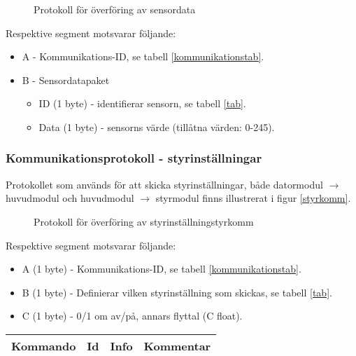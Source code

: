 \documentclass[11pt]{article}
\begin{document}
\begin{flushleft}
 \begin{figure}[H]
\centering
\noindent\resizebox{.8\linewidth}{!}{
	}
	\caption{Protokoll för överföring av sensordata\label{sensordata}}	
\end{figure} 

Respektive segment motsvarar följande: 
\begin{itemize}
	\item A - Kommunikations-ID, se tabell \ref{kommunikationstab}.
	\item B - Sensordatapaket
	\begin{itemize}
	\item ID (1 byte) - identifierar sensorn, se tabell \ref{tab}.
	\item Data (1 byte) - sensorns värde (tillåtna värden: 0-245).
	\end{itemize}
\end{itemize}

\subsubsection{Kommunikationsprotokoll - styrinställningar}
Protokollet som används för att skicka styrinställningar, både datormodul $\rightarrow$ huvudmodul och huvudmodul $\rightarrow$ styrmodul finns illustrerat i figur \ref{styrkomm}.

\begin{figure}[htbp]
\centering
\noindent\resizebox{.8\linewidth}{!}{
	}
	\caption{Protokoll för överföring av styrinställning{styrkomm}}	
\end{figure}

Respektive segment motsvarar följande: 
\begin{itemize}
	\item A (1 byte) - Kommunikations-ID, se tabell \ref{kommunikationstab}.
	\item B (1 byte) - Definierar vilken styrinställning som skickas, se tabell \ref{tab}.
	\item C (1 byte) - 0/1 om av/på, annars flyttal (C float).
\end{itemize}

\pagebreak

\begin{table}[h]
\begin{tabular}{|p{6em}|p{1em}|p{6em}|p{25em}|} \hline

\textbf{Kommando} & \textbf{Id} & \textbf{Info} & \textbf{Kommentar}\\ \hline


\end{tabular}
\end{table}
\end{flushleft}
\end{document}
